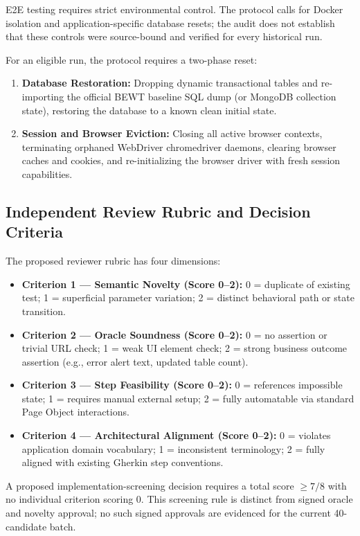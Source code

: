 \documentclass[pdflatex,sn-mathphys-num]{sn-jnl}
\begin{document}
E2E testing requires strict environmental control. The protocol calls for Docker isolation and application-specific database resets; the audit does not establish that these controls were source-bound and verified for every historical run.

For an eligible run, the protocol requires a two-phase reset:
\begin{enumerate}
    \item \textbf{Database Restoration:} Dropping dynamic transactional tables and re-importing the official BEWT baseline SQL dump (or MongoDB collection state), restoring the database to a known clean initial state.
    \item \textbf{Session and Browser Eviction:} Closing all active browser contexts, terminating orphaned WebDriver chromedriver daemons, clearing browser caches and cookies, and re-initializing the browser driver with fresh session capabilities.
\end{enumerate}

\subsection{Independent Review Rubric and Decision Criteria}

The proposed reviewer rubric has four dimensions:
\begin{itemize}
    \item \textbf{Criterion 1 --- Semantic Novelty (Score 0--2):} 0 = duplicate of existing test; 1 = superficial parameter variation; 2 = distinct behavioral path or state transition.
    \item \textbf{Criterion 2 --- Oracle Soundness (Score 0--2):} 0 = no assertion or trivial URL check; 1 = weak UI element check; 2 = strong business outcome assertion (e.g., error alert text, updated table count).
    \item \textbf{Criterion 3 --- Step Feasibility (Score 0--2):} 0 = references impossible state; 1 = requires manual external setup; 2 = fully automatable via standard Page Object interactions.
    \item \textbf{Criterion 4 --- Architectural Alignment (Score 0--2):} 0 = violates application domain vocabulary; 1 = inconsistent terminology; 2 = fully aligned with existing Gherkin step conventions.
\end{itemize}
A proposed implementation-screening decision requires a total score $\ge 7/8$ with no individual criterion scoring 0. This screening rule is distinct from signed oracle and novelty approval; no such signed approvals are evidenced for the current 40-candidate batch.
\end{document}
